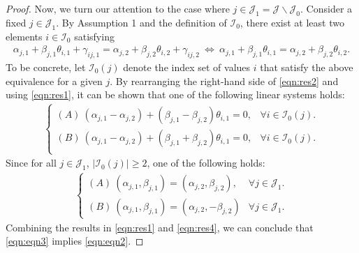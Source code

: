 \documentclass[11pt]{article}
\begin{document}
\begin{proof}
    Now, we turn our attention to the case where $j \in \mathcal{J}_1 = \mathcal{J}\backslash \mathcal{J}_0 $. Consider a fixed $ j \in \mathcal{J}_1 $. By Assumption 1 and the definition of $\mathcal{I}_0$, there exist at least two elements $ i \in \mathcal{I}_0 $ satisfying
    \begin{align}\label{eqn:res2}
        \alpha_{j,1} + \beta_{j,1} \theta_{i,1} + \gamma_{ij, 1} = \alpha_{j,2} + \beta_{j,2} \theta_{i,2} + \gamma_{ij, 2}
        ~\Longleftrightarrow~ \alpha_{j,1} + \beta_{j,1} \theta_{i,1} = \alpha_{j,2} + \beta_{j,2} \theta_{i,2}.
    \end{align}
    To be concrete, let $ \mathcal{I}_0(j) $ denote the index set of values $ i $ that satisfy the above equivalence for a given $ j $. By rearranging the right-hand side of \eqref{eqn:res2} and using \eqref{eqn:res1}, it can be shown that one of the following linear systems holds:
    \begin{align}\label{eqn:res3}
    \begin{cases}
       (A)~ (\alpha_{j,1} - \alpha_{j,2}) + (\beta_{j,1} - \beta_{j,2}) \theta_{i,1} = 0, & \forall i \in \mathcal{I}_0(j).\\
       (B)~ (\alpha_{j,1} - \alpha_{j,2}) + (\beta_{j,1} + \beta_{j,2}) \theta_{i,1} = 0, & \forall i \in \mathcal{I}_0(j).\\
    \end{cases}
    \end{align}
    Since for all $ j \in \mathcal{J}_1 $, $ |\mathcal{I}_0(j)| \geq 2 $, one of the following holds:
    \begin{align}\label{eqn:res4}
        \begin{cases}
            (A)~ (\alpha_{j,1}, \beta_{j,1}) = (\alpha_{j,2}, \beta_{j,2}), & \forall j \in \mathcal{J}_1.\\
            (B)~ (\alpha_{j,1}, \beta_{j,1}) = (\alpha_{j,2}, -\beta_{j,2}) & \forall j \in \mathcal{J}_1.
        \end{cases}
    \end{align}
    Combining the results in \eqref{eqn:res1} and \eqref{eqn:res4}, we can conclude that \eqref{eqn:eqn3} implies \eqref{eqn:eqn2}.
\end{proof}



\end{document}
